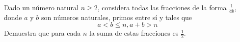 Dado un número natural $n \geq 2$, considera todas las fracciones de la forma $\frac{1}{ab}$, donde $a$ y $b$ son números naturales, primos entre sí y tales que
\[ a < b \leq n, a+b > n \]
Demuestra que para cada $n$ la suma de estas fracciones es $\frac{1}{2}$.
